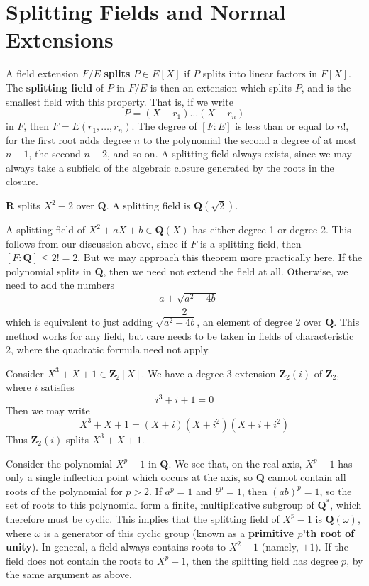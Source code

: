 \section{Splitting Fields and Normal Extensions}

A field extension $F/E$ {\bf splits} $P \in E[X]$ if $P$ splits into linear factors in $F[X]$. The {\bf splitting field} of $P$ in $F/E$ is then an extension which splits $P$, and is the smallest field with this property. That is, if we write
%
\[ P = (X - r_1) \dots (X - r_n) \]
%
in $F$, then $F = E(r_1, \dots, r_n)$. The degree of $[F:E]$ is less than or equal to $n!$, for the first root adds degree $n$ to the polynomial the second a degree of at most $n-1$, the second $n-2$, and so on. A splitting field always exists, since we may always take a subfield of the algebraic closure generated by the roots in the closure.

\begin{example}
    $\mathbf{R}$ splits $X^2 - 2$ over $\mathbf{Q}$. A splitting field is $\mathbf{Q}(\sqrt{2})$.
\end{example}

\begin{example}
    A splitting field of $X^2 + aX + b \in \mathbf{Q}(X)$ has either degree 1 or degree 2. This follows from our discussion above, since if $F$ is a splitting field, then $[F: \mathbf{Q}] \leq 2! = 2$. But we may approach this theorem more practically here. If the polynomial splits in $\mathbf{Q}$, then we need not extend the field at all. Otherwise, we need to add the numbers
    \[ \frac{-a \pm \sqrt{a^2 - 4b}}{2} \]
    which is equivalent to just adding $\sqrt{a^2 - 4b}$, an element of degree 2 over $\mathbf{Q}$. This method works for any field, but care needs to be taken in fields of characteristic 2, where the quadratic formula need not apply.
\end{example}

\begin{example}
    Consider $X^3 + X + 1 \in \mathbf{Z}_2[X]$. We have a degree 3 extension $\mathbf{Z}_2(i)$ of $\mathbf{Z}_2$, where $i$ satisfies
    \[ i^3 + i + 1 = 0 \]
    Then we may write
    \[ X^3 + X + 1 = (X + i)(X + i^2)(X + i + i^2) \]
    Thus $\mathbf{Z}_2(i)$ splits $X^3 + X + 1$.
\end{example}

\begin{example}
    Consider the polynomial $X^p - 1$ in $\mathbf{Q}$. We see that, on the real axis, $X^p - 1$ has only a single inflection point which occurs at the axis, so $\mathbf{Q}$ cannot contain all roots of the polynomial for $p > 2$. If $a^p = 1$ and $b^p = 1$, then $(ab)^p = 1$, so the set of roots to this polynomial form a finite, multiplicative subgroup of $\mathbf{Q}^*$, which therefore must be cyclic. This implies that the splitting field of $X^p - 1$ is $\mathbf{Q}(\omega)$, where $\omega$ is a generator of this cyclic group (known as a {\bf primitive $p$'th root of unity}). In general, a field always contains roots to $X^2 - 1$ (namely, $\pm 1$). If the field does not contain the roots to $X^p - 1$, then the splitting field has degree $p$, by the same argument as above.
\end{example}

